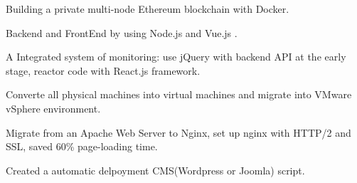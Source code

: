 \documentclass[]{deedy-resume-openfont}
\begin{document}
\begin{minipage}[t]{0.45\textwidth}
\begin{tightemize}
    \item Building a private multi-node Ethereum blockchain with Docker.
    \item Backend and FrontEnd by using Node.js and Vue.js .
\end{tightemize}

\begin{tightemize}
    \item A Integrated system of monitoring: use jQuery with backend API at the early stage, reactor code with React.js framework.
\end{tightemize}
\sectionsep

\begin{tightemize}
    \item Converte all physical machines into virtual machines and migrate into VMware vSphere environment.
    \item Migrate from an Apache Web Server to Nginx, set up nginx with HTTP/2 and SSL, saved 60\% page-loading time.
    \item Created a automatic delpoyment CMS(Wordpress or Joomla) script.
\end{tightemize}
\sectionsep

%
%

\end{minipage}
\hfill
\end{document}
